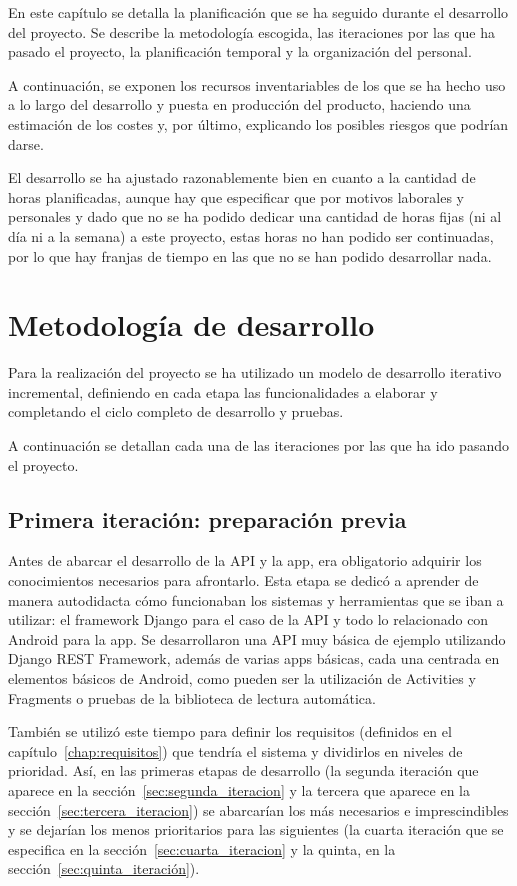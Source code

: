 En este capítulo se detalla la planificación que se ha seguido durante el
desarrollo del proyecto. Se describe la metodología escogida, las iteraciones
por las que ha pasado el proyecto, la planificación temporal y la organización
del personal.

A continuación, se exponen los recursos inventariables de los que se ha hecho
uso a lo largo del desarrollo y puesta en producción del producto, haciendo una
estimación de los costes y, por último, explicando los posibles riesgos que
podrían darse.

El desarrollo se ha ajustado razonablemente bien en cuanto a la
cantidad de horas planificadas, aunque hay que especificar que por motivos
laborales y personales y dado que no se ha podido dedicar una cantidad de horas
fijas (ni al día ni a la semana) a este proyecto, estas horas no han podido ser
continuadas, por lo que hay franjas de tiempo en las que no se han podido
desarrollar nada.

\section{Metodología de desarrollo}

Para la realización del proyecto se ha utilizado un modelo de desarrollo
iterativo incremental, definiendo en cada etapa las funcionalidades a
elaborar y completando el ciclo completo de desarrollo y pruebas. 

A continuación se detallan cada una de las iteraciones por las que ha ido
pasando el proyecto.

\subsection{Primera iteración: preparación previa}
\label{sec:primera_iteracion}

Antes de abarcar el desarrollo de la API y la app, era obligatorio adquirir los
conocimientos necesarios para afrontarlo. Esta etapa se dedicó a aprender de
manera autodidacta cómo funcionaban los sistemas y herramientas que se iban a
utilizar: el framework Django para el caso de la API y todo lo relacionado con
Android para la app. Se desarrollaron una API muy básica de ejemplo utilizando
Django REST Framework, además de varias apps básicas, cada una centrada en
elementos básicos de Android, como pueden ser la utilización de Activities y
Fragments o pruebas de la biblioteca de lectura automática.

También se utilizó este tiempo para definir los requisitos (definidos en el
capítulo~\ref{chap:requisitos}) que tendría el sistema y dividirlos en niveles
de prioridad. Así, en las primeras etapas de desarrollo (la segunda iteración que
aparece en la sección~\ref{sec:segunda_iteracion} y la tercera que aparece en la
sección~\ref{sec:tercera_iteracion}) se abarcarían los más necesarios e
imprescindibles y se dejarían los menos prioritarios para las siguientes (la
cuarta iteración que se especifica en la sección~\ref{sec:cuarta_iteracion} y
la quinta, en la sección~\ref{sec:quinta_iteración}).

